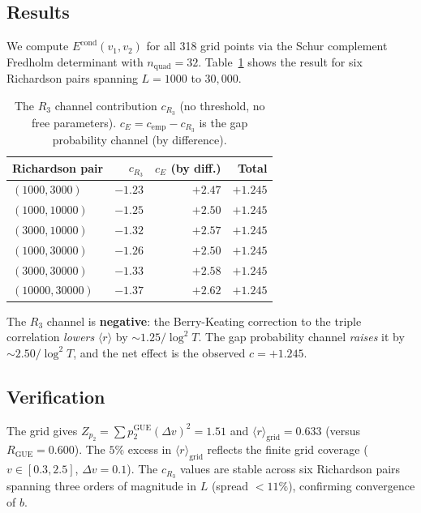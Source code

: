\documentclass[11pt]{article}
\begin{document}
\subsection{Results}

We compute $E^{\mathrm{cond}}(v_1, v_2)$ for all 318 grid points via
the Schur complement Fredholm determinant with $n_{\mathrm{quad}} = 32$.
Table~\ref{tab:channels} shows the result for six Richardson pairs spanning
$L = 1000$ to $30{,}000$.

\begin{table}[ht]
\centering
\caption{The $R_3$ channel contribution $c_{R_3}$ (no threshold, no free parameters).
$c_E = c_{\mathrm{emp}} - c_{R_3}$ is the gap probability channel (by difference).}
\label{tab:channels}
\begin{tabular}{lrrr}
\toprule
Richardson pair & $c_{R_3}$ & $c_E$ (by diff.) & Total \\
\midrule
$(1000, 3000)$ & $-1.23$ & $+2.47$ & $+1.245$ \\
$(1000, 10000)$ & $-1.25$ & $+2.50$ & $+1.245$ \\
$(3000, 10000)$ & $-1.32$ & $+2.57$ & $+1.245$ \\
$(1000, 30000)$ & $-1.26$ & $+2.50$ & $+1.245$ \\
$(3000, 30000)$ & $-1.33$ & $+2.58$ & $+1.245$ \\
$(10000, 30000)$ & $-1.37$ & $+2.62$ & $+1.245$ \\
\bottomrule
\end{tabular}
\end{table}

The $R_3$ channel is \textbf{negative}: the Berry-Keating correction to the
triple correlation \emph{lowers} $\langle r\rangle$ by $\sim 1.25/\log^2 T$.
The gap probability channel \emph{raises} it by $\sim 2.50/\log^2 T$, and
the net effect is the observed $c = +1.245$.

\subsection{Verification}

The grid gives $Z_{p_2} = \sum p_2^{\mathrm{GUE}} (\Delta v)^2 = 1.51$
and $\langle r\rangle_{\mathrm{grid}} = 0.633$ (versus $R_{\mathrm{GUE}} = 0.600$).
The $5\%$ excess in $\langle r\rangle_{\mathrm{grid}}$ reflects the finite
grid coverage ($v \in [0.3, 2.5]$, $\Delta v = 0.1$). The $c_{R_3}$ values
are stable across six Richardson pairs spanning three orders of magnitude
in $L$ (spread $< 11\%$), confirming convergence of $b$.
\end{document}
